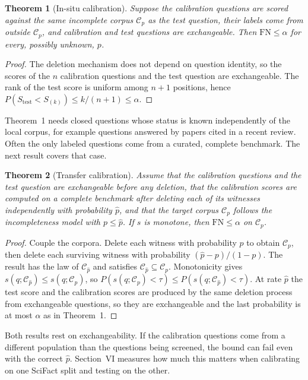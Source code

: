 \documentclass[conference,a4paper]{IEEEtran}
\newtheorem{theorem}{Theorem}
\theoremstyle{definition}
\begin{document}
\begin{theorem}[In-situ calibration]
Suppose the calibration questions are scored against the same incomplete corpus $\mathcal{C}_p$ as the test question, their labels come from outside $\mathcal{C}_p$, and calibration and test questions are exchangeable. Then $\mathrm{FN}\le\alpha$ for every, possibly unknown, $p$.
\end{theorem}
\begin{proof}
The deletion mechanism does not depend on question identity, so the scores of the $n$ calibration questions and the test question are exchangeable. The rank of the test score is uniform among $n+1$ positions, hence $P(S_{\mathrm{test}}<S_{(k)})\le k/(n+1)\le\alpha$.
\end{proof}

Theorem~1 needs closed questions whose status is known independently of the local corpus, for example questions answered by papers cited in a recent review. Often the only labeled questions come from a curated, complete benchmark. The next result covers that case.

\begin{theorem}[Transfer calibration]
Assume that the calibration questions and the test question are exchangeable before any deletion, that the calibration scores are computed on a complete benchmark after deleting each of its witnesses independently with probability $\hat p$, and that the target corpus $\mathcal{C}_p$ follows the incompleteness model with $p\le\hat p$. If $s$ is monotone, then $\mathrm{FN}\le\alpha$ on $\mathcal{C}_p$.
\end{theorem}
\begin{proof}
Couple the corpora. Delete each witness with probability $p$ to obtain $\mathcal{C}_p$, then delete each surviving witness with probability $(\hat p-p)/(1-p)$. The result has the law of $\mathcal{C}_{\hat p}$ and satisfies $\mathcal{C}_{\hat p}\subseteq\mathcal{C}_p$. Monotonicity gives $s(q;\mathcal{C}_{\hat p})\le s(q;\mathcal{C}_p)$, so $P(s(q;\mathcal{C}_p)<\tau)\le P(s(q;\mathcal{C}_{\hat p})<\tau)$. At rate $\hat p$ the test score and the calibration scores are produced by the same deletion process from exchangeable questions, so they are exchangeable and the last probability is at most $\alpha$ as in Theorem~1.
\end{proof}

Both results rest on exchangeability. If the calibration questions come from a different population than the questions being screened, the bound can fail even with the correct $\hat p$. Section~VI measures how much this matters when calibrating on one SciFact split and testing on the other.
\end{document}
